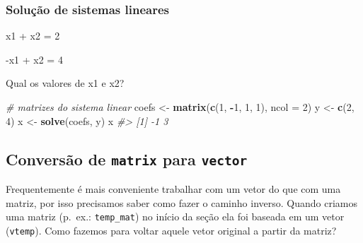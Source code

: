 \documentclass[]{book}
\newenvironment{Shaded}{\begin{snugshade}}{\end{snugshade}}
\newcommand{\KeywordTok}[1]{\textcolor[rgb]{0.13,0.29,0.53}{\textbf{#1}}}
\newcommand{\DataTypeTok}[1]{\textcolor[rgb]{0.13,0.29,0.53}{#1}}
\newcommand{\DecValTok}[1]{\textcolor[rgb]{0.00,0.00,0.81}{#1}}
\newcommand{\StringTok}[1]{\textcolor[rgb]{0.31,0.60,0.02}{#1}}
\newcommand{\CommentTok}[1]{\textcolor[rgb]{0.56,0.35,0.01}{\textit{#1}}}
\newcommand{\OperatorTok}[1]{\textcolor[rgb]{0.81,0.36,0.00}{\textbf{#1}}}
\newcommand{\NormalTok}[1]{#1}
\begin{document}
\subsubsection{Solução de sistemas
lineares}\label{solucao-de-sistemas-lineares}

x1 + x2 = 2

-x1 + x2 = 4

Qual os valores de x1 e x2?

\begin{Shaded}
\begin{Highlighting}[]
\CommentTok{# matrizes do sistema linear}
\NormalTok{coefs <-}\StringTok{ }\KeywordTok{matrix}\NormalTok{(}\KeywordTok{c}\NormalTok{(}\DecValTok{1}\NormalTok{, }\OperatorTok{-}\DecValTok{1}\NormalTok{, }\DecValTok{1}\NormalTok{, }\DecValTok{1}\NormalTok{), }\DataTypeTok{ncol =} \DecValTok{2}\NormalTok{)}
\NormalTok{y <-}\StringTok{ }\KeywordTok{c}\NormalTok{(}\DecValTok{2}\NormalTok{, }\DecValTok{4}\NormalTok{)}
\NormalTok{x <-}\StringTok{ }\KeywordTok{solve}\NormalTok{(coefs, y)}
\NormalTok{x}
\CommentTok{#> [1] -1  3}
\end{Highlighting}
\end{Shaded}

\subsection{\texorpdfstring{Conversão de \texttt{matrix} para
\texttt{vector}}{Conversão de matrix para vector}}\label{conversao-de-matrix-para-vector}

Frequentemente é mais conveniente trabalhar com um vetor do que com uma
matriz, por isso precisamos saber como fazer o caminho inverso. Quando
criamos uma matriz (p.~ex.: \texttt{temp\_mat}) no início da seção ela
foi baseada em um vetor (\texttt{vtemp}). Como fazemos para voltar
aquele vetor original a partir da matriz?
\end{document}
